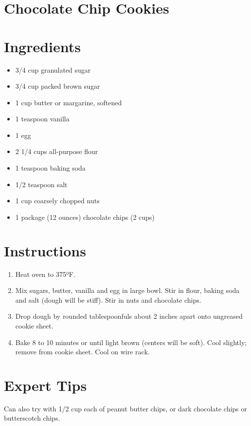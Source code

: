 \section{Chocolate Chip Cookies}

\section{Ingredients}
\begin{itemize}
\item 3/4 cup granulated sugar
\item 3/4 cup packed brown sugar
\item 1 cup butter or margarine, softened
\item 1 teaspoon vanilla
\item 1 egg
\item 2 1/4 cups all-purpose flour
\item 1 teaspoon baking soda
\item 1/2 teaspoon salt
\item 1 cup coarsely chopped nuts
\item 1 package (12 ounces) chocolate chips (2 cups)
\end{itemize}

\section{Instructions}
\begin{enumerate}
\item  Heat oven to 375ºF.
\item Mix sugars, butter, vanilla and egg in large bowl. Stir in flour, baking soda and salt (dough will be stiff). Stir in nuts and chocolate chips.
\item Drop dough by rounded tablespoonfuls about 2 inches apart onto ungreased cookie sheet.
\item Bake 8 to 10 minutes or until light brown (centers will be soft). Cool slightly; remove from cookie sheet. Cool on wire rack.
\end{enumerate}

\section*{Expert Tips}
Can also try with 1/2 cup each of peanut butter chips, or dark chocolate chips or butterscotch chips.


